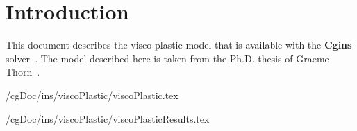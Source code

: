 \documentclass[11pt]{article}
\newcommand{\vpDir}{\homeHenshaw/cgDoc/ins/viscoPlastic}
\begin{document}
\tableofcontents

\vfill\eject


\section{Introduction}

This document describes the visco-plastic model that is available with the {\bf Cgins} solver~\cite{CginsUserGuide}.
The model described here is taken from the Ph.D. thesis of Graeme Thorn~\cite{Thorn2004}.

 \vpDir/viscoPlastic.tex







 \vpDir/viscoPlasticResults.tex


\vfill\eject


\end{document}
